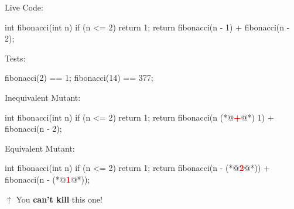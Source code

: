 \documentclass{article}
\begin{document}
\begin{pptWide}{3}
Live Code:\par
{\small\begin{ffcode}
int fibonacci(int n) {
  if (n <= 2) {
    return 1;
  }
  return fibonacci(n - 1)
    + fibonacci(n - 2);
}
\end{ffcode}
}
\par
Tests:\par
{\small\begin{ffcode}
fibonacci(2) == 1;
fibonacci(14) == 377;
\end{ffcode}
}
\par\columnbreak\par
Inequivalent Mutant:\par
{\small\begin{ffcode}
int fibonacci(int n) {
  if (n <= 2) {
    return 1;
  }
  return fibonacci(n (*@\textcolor{red}{\textbf{+}}@*) 1)
    + fibonacci(n - 2);
}
\end{ffcode}
}
\par\columnbreak\par
Equivalent Mutant:\par
{\small\begin{ffcode}
int fibonacci(int n) {
  if (n <= 2) {
    return 1;
  }
  return fibonacci(n - (*@\textcolor{red}{\textbf{2}}@*))
    + fibonacci(n - (*@\textcolor{red}{\textbf{1}}@*));
}
\end{ffcode}
}
\par
\(\uparrow\) You \textbf{can't kill} this one!
\end{pptWide}
\plush{}
\end{document}
